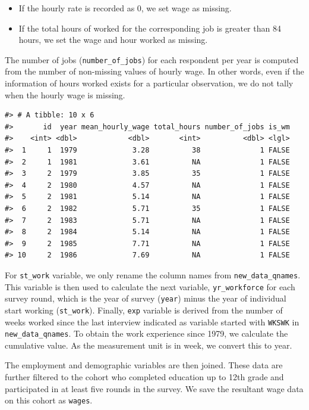 \documentclass{article}
\begin{document}
\begin{itemize}
\tightlist
\item
  If the hourly rate is recorded as 0, we set wage as missing.
\item
  If the total hours of worked for the corresponding job is greater than 84 hours, we set the wage and hour worked as missing.
\end{itemize}

The number of jobs (\texttt{number\_of\_jobs}) for each respondent per year is computed from the number of non-missing values of hourly wage. In other words, even if the information of hours worked exists for a particular observation, we do not tally when the hourly wage is missing.

\begin{verbatim}
#> # A tibble: 10 x 6
#>       id  year mean_hourly_wage total_hours number_of_jobs is_wm
#>    <int> <dbl>            <dbl>       <int>          <dbl> <lgl>
#>  1     1  1979             3.28          38              1 FALSE
#>  2     1  1981             3.61          NA              1 FALSE
#>  3     2  1979             3.85          35              1 FALSE
#>  4     2  1980             4.57          NA              1 FALSE
#>  5     2  1981             5.14          NA              1 FALSE
#>  6     2  1982             5.71          35              1 FALSE
#>  7     2  1983             5.71          NA              1 FALSE
#>  8     2  1984             5.14          NA              1 FALSE
#>  9     2  1985             7.71          NA              1 FALSE
#> 10     2  1986             7.69          NA              1 FALSE
\end{verbatim}

For \texttt{st\_work} variable, we only rename the column names from \texttt{new\_data\_qnames}. This variable is then used to calculate the next variable, \texttt{yr\_workforce} for each survey round, which is the year of survey (\texttt{year}) minus the year of individual start working (\texttt{st\_work}). Finally, \texttt{exp} variable is derived from the number of weeks worked since the last interview indicated as variable started with \texttt{WKSWK} in \texttt{new\_data\_qnames}. To obtain the work experience since 1979, we calculate the cumulative value. As the measurement unit is in week, we convert this to year.

The employment and demographic variables are then joined. These data are further filtered to the cohort who completed education up to 12th grade and participated in at least five rounds in the survey. We save the resultant wage data on this cohort as \texttt{wages}.
\end{document}
